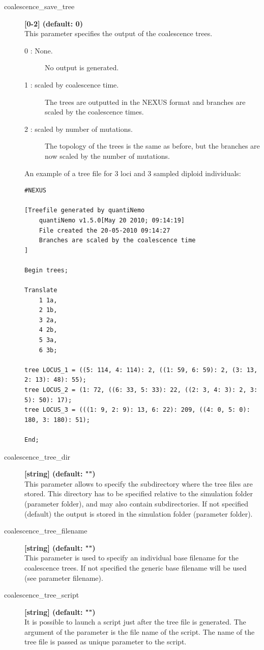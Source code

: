 \documentclass[letterpaper,12pt,oneside]{book}
\begin{document}
\begin{description} 
\item[coalescence\_save\_tree] \textbf{[0-2] (default: 0)} \\
This parameter specifies the output of the coalescence trees.
\begin{description}
\item [0 : None.] No output is generated.
\item [1 : scaled by coalescence time.] The trees are outputted in the NEXUS format and branches are scaled by the coalescence times.
\item [2 : scaled by number of mutations.] The topology of the trees is the same as before, but the branches are now scaled by the number of mutations.
\end{description} 

An example of a tree file for 3 loci and 3 sampled diploid individuals:
\begin{lstlisting}[frame=single]
#NEXUS

[Treefile generated by quantiNemo
    quantiNemo v1.5.0[May 20 2010; 09:14:19]
    File created the 20-05-2010 09:14:27
    Branches are scaled by the coalescence time
]

Begin trees;

Translate
    1 1a,
    2 1b,
    3 2a,
    4 2b,
    5 3a,
    6 3b;

tree LOCUS_1 = ((5: 114, 4: 114): 2, ((1: 59, 6: 59): 2, (3: 13, 2: 13): 48): 55);
tree LOCUS_2 = (1: 72, ((6: 33, 5: 33): 22, ((2: 3, 4: 3): 2, 3: 5): 50): 17);
tree LOCUS_3 = (((1: 9, 2: 9): 13, 6: 22): 209, ((4: 0, 5: 0): 180, 3: 180): 51);

End;
\end{lstlisting}

\item[coalescence\_tree\_dir] \textbf{[string] (default: "")}\\
This parameter allows to specify the subdirectory where the tree files are stored. This directory has to be specified relative to the simulation folder (parameter \textsf{folder}), and may also contain subdirectories. If not specified (default) the output is stored in the simulation folder (parameter \textsf{folder}).

\item[coalescence\_tree\_filename] \textbf{[string] (default: "")}\\
This parameter is used to specify an individual base filename for the coalescence trees. If not specified the generic base filename will be used (see parameter \textsf{filename}).


\item[coalescence\_tree\_script] \textbf{[string] (default: "")}\\
It is possible to launch a script just after the tree file is generated. The argument of the parameter is the file name of the script. The name of the tree file is passed as unique parameter to the script. 
\end{description}
\end{document}
